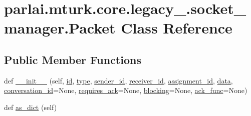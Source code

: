 \hypertarget{classparlai_1_1mturk_1_1core_1_1legacy__2018_1_1socket__manager_1_1Packet}{}\section{parlai.\+mturk.\+core.\+legacy\+\_.\+socket\+\_\+manager.\+Packet Class Reference}
\label{classparlai_1_1mturk_1_1core_1_1legacy__2018_1_1socket__manager_1_1Packet}
\subsection*{Public Member Functions}
\begin{DoxyCompactItemize}
\item 
def \hyperlink{classparlai_1_1mturk_1_1core_1_1legacy__2018_1_1socket__manager_1_1Packet_af3a8c6a90bdde11dc1663cd13bf0dca7}{\+\_\+\+\_\+init\+\_\+\+\_\+} (self, \hyperlink{classparlai_1_1mturk_1_1core_1_1legacy__2018_1_1socket__manager_1_1Packet_ae539e80c978b6fa4ac0332cb8fdb4459}{id}, \hyperlink{classparlai_1_1mturk_1_1core_1_1legacy__2018_1_1socket__manager_1_1Packet_ab3209be95628003e108788a9ac459206}{type}, \hyperlink{classparlai_1_1mturk_1_1core_1_1legacy__2018_1_1socket__manager_1_1Packet_a4aa15cc8e64d313e3f22546df8738ba5}{sender\+\_\+id}, \hyperlink{classparlai_1_1mturk_1_1core_1_1legacy__2018_1_1socket__manager_1_1Packet_af58d168251594cf0de296a96e9772d51}{receiver\+\_\+id}, \hyperlink{classparlai_1_1mturk_1_1core_1_1legacy__2018_1_1socket__manager_1_1Packet_a3ffd9aa8c6038c62d5ce56cc730ab354}{assignment\+\_\+id}, \hyperlink{classparlai_1_1mturk_1_1core_1_1legacy__2018_1_1socket__manager_1_1Packet_adcb59e4297d2ac5842f963591a2c8aff}{data}, \hyperlink{classparlai_1_1mturk_1_1core_1_1legacy__2018_1_1socket__manager_1_1Packet_add03541844fbd3e7fdb9260b6c67f444}{conversation\+\_\+id}=None, \hyperlink{classparlai_1_1mturk_1_1core_1_1legacy__2018_1_1socket__manager_1_1Packet_af9b94a2fd15ede3a9abe55e7d361932c}{requires\+\_\+ack}=None, \hyperlink{classparlai_1_1mturk_1_1core_1_1legacy__2018_1_1socket__manager_1_1Packet_a0545e4302a6a6c212479c583009b00d1}{blocking}=None, \hyperlink{classparlai_1_1mturk_1_1core_1_1legacy__2018_1_1socket__manager_1_1Packet_ab0512c9df9c767ce809ae9a93a80dae6}{ack\+\_\+func}=None)
\item 
def \hyperlink{classparlai_1_1mturk_1_1core_1_1legacy__2018_1_1socket__manager_1_1Packet_aa9cf63872aaa1f152fef9cdbe2069b17}{as\+\_\+dict} (self)

\end{DoxyCompactItemize}
